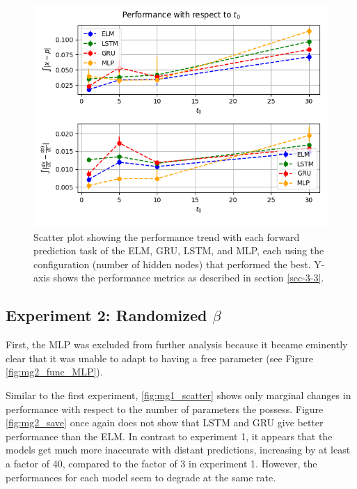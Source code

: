 \documentclass[11pt]{article}
\begin{document}
  \begin{figure}
    \begin{center}
   \includegraphics[width=.96\textwidth]{figures/mg1_save.png}       
    \caption{Scatter plot showing the performance trend with each forward prediction task of the ELM, GRU, LSTM, and MLP, each using the configuration (number of hidden nodes) that performed the best. Y-axis shows the performance metrics as described in section \ref{sec-3-3}.}
    \label{fig:mg1_save}
    \end{center}
  \end{figure}

  \subsection {Experiment 2: Randomized $\beta$}

  First, the MLP was excluded from further analysis because it became eminently clear that it
  was unable to adapt to having a free parameter (see Figure
  \ref{fig:mg2_func_MLP}).


  Similar to the first experiment,
  \ref{fig:mg1_scatter} shows only marginal changes in performance with
  respect to the number of parameters the possess. Figure \ref{fig:mg2_save} once again 
  does not show that LSTM and GRU give better performance
  than the ELM. In contrast to experiment 1, it appears that
  the models get much more inaccurate with distant
  predictions, increasing by at least a factor of 40, compared to the factor of 3 in experiment 1. However, the performances for each model seem to
  degrade at the same rate.
\end{document}
